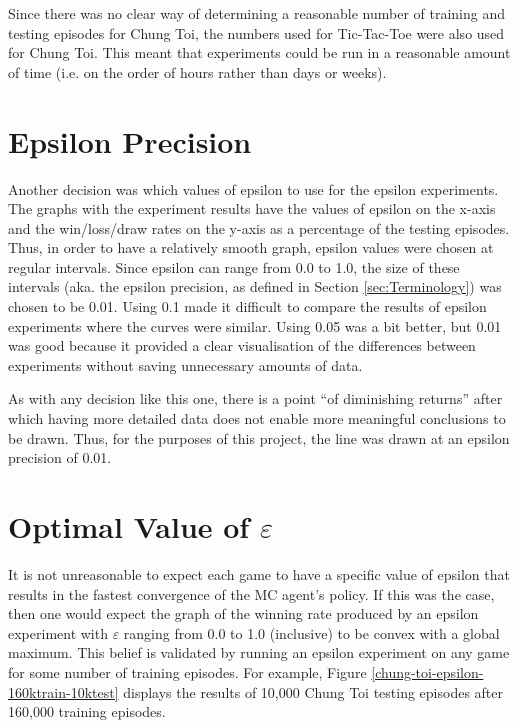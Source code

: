 \documentclass[11pt,a4paper]{report}
\begin{document}
Since there was no clear way of determining a reasonable number of training and testing episodes for Chung Toi, the numbers used for Tic-Tac-Toe were also used for Chung Toi. This meant that experiments could be run in a reasonable amount of time (i.e. on the order of hours rather than days or weeks).


\section{Epsilon Precision}
\label{sec:epsilon-precision}

Another decision was which values of epsilon to use for the epsilon experiments. The graphs with the experiment results have the values of epsilon on the x-axis and the win/loss/draw rates on the y-axis as a percentage of the testing episodes. Thus, in order to have a relatively smooth graph, epsilon values were chosen at regular intervals. Since epsilon can range from 0.0 to 1.0, the size of these intervals (aka. the epsilon precision, as defined in Section \ref{sec:Terminology}) was chosen to be 0.01. Using 0.1 made it difficult to compare the results of epsilon experiments where the curves were similar. Using 0.05 was a bit better, but 0.01 was good because it provided a clear visualisation of the differences between experiments without saving unnecessary amounts of data.

As with any decision like this one, there is a point ``of diminishing returns'' after which having more detailed data does not enable more meaningful conclusions to be drawn. Thus, for the purposes of this project, the line was drawn at an epsilon precision of 0.01.


\section{Optimal Value of $\varepsilon$}
\label{sec:optimal_epsilon}

It is not unreasonable to expect each game to have a specific value of epsilon that results in the fastest convergence of the MC agent's policy. If this was the case, then one would expect the graph of the winning rate produced by an epsilon experiment with $\varepsilon$ ranging from 0.0 to 1.0 (inclusive) to be convex with a global maximum. This belief is validated by running an epsilon experiment on any game for some number of training episodes. For example, Figure \ref{chung-toi-epsilon-160ktrain-10ktest} displays the results of 10,000 Chung Toi testing episodes after 160,000 training episodes.
\end{document}
